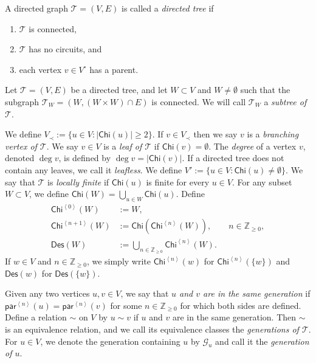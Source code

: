 \documentclass[11pt, reqno, a4paper]{amsart}
\theoremstyle{definition}
\newcommand{\calT}{{\mathcal{T}}}
\newcommand{\scrG}{{\mathscr G}}
\newcommand{\scrT}{{\mathscr T}}
\newcommand{\ip}[1]{\left\langle #1 \right\rangle}
\renewcommand{\ge}{\geqslant}
\newcommand{\Z}{\mathbb Z}
\newcommand{\Chi}{\mathsf{Chi}}
\newcommand{\pr}{\mathsf{par}}
\numberwithin{equation}{section}
\begin{document}
A directed graph $\scrT = ( V,  E)$ is called a \textit{directed tree} if 
\begin{enumerate}[noitemsep]
    \item[(i)] $\scrT$ is connected,
    \item[(ii)] $\scrT$ has no circuits, and 
    \item [(iii)] each vertex $v \in  V ^{\circ}$ has a parent.
\end{enumerate}

Let $\mathscr T = (V,E)$ be a directed tree, and let $W \subset V$ and $W \ne \emptyset$ such that the subgraph $\calT_{W} = (W, (W\times W) \cap E )$ is connected. We will call $\calT_W$ a \textit{subtree of $\scrT$}.

    We define $ V_{\prec} := \{ u \in  V : \lvert \Chi (u) \rvert \ge 2 \}$. If $v \in  V_{\prec}$ then we say $v$ is a \textit{branching vertex of $\scrT$}. We say $v \in  V$ is a \textit{leaf of $\scrT$} if $\Chi (v) = \emptyset$. The \textit{degree} of a vertex $v$, denoted $\deg v$, is defined by $\deg v = |\Chi (v)|$. If a directed tree does not contain any leaves, we call it \textit{leafless}. We define $V' := \{u \in V : \Chi(u) \ne \emptyset\}$. We say that $\scrT$ is \textit{locally finite} if $\Chi(u)$ is finite for every $u \in V$. For any subset $W \subset  V$, we define $\Chi (W) = \bigcup_{u \in W} \Chi (u)$. Define
    \begin{equation*}
        \begin{aligned}
            \Chi ^{\ip{0}} (W) &:= W, \\
            \Chi ^{\ip{n+1}} (W) &:= \Chi (\Chi ^{\ip{n}} (W)), \qquad n \in \Z_{\ge 0}, \\
            \mathsf{Des} (W) &:= \bigcup_{n \in \Z_{\ge 0}} \Chi^{\ip{n}} (W).
        \end{aligned}
    \end{equation*}
    If $w\in V$ and $n\in\Z_{\ge0}$, we simply write $\Chi^{\ip{n}}(w)$ for $\Chi^{\ip{n}}(\{w\})$ and $\mathsf{Des}(w)$ for $\mathsf{Des}(\{w\})$.


    Given any two vertices $u,v\in V$, we say that \textit{$u$ and $v$ are in the same generation} if $\pr^{\ip{n}}(u)=\pr^{\ip{n}}(v)$ for some $n\in\Z_{\ge 0}$ for which both sides are defined. Define a relation $\sim$ on $ V$ by $u\sim v$ if $u$ and $v$ are in the same generation. Then $\sim$ is an equivalence relation, and we call its equivalence classes the \textit{generations of $\scrT$}. For $u\in V$, we denote the generation containing $u$ by $\scrG_u$ and call it the \textit{generation of $u$}.
\end{document}
